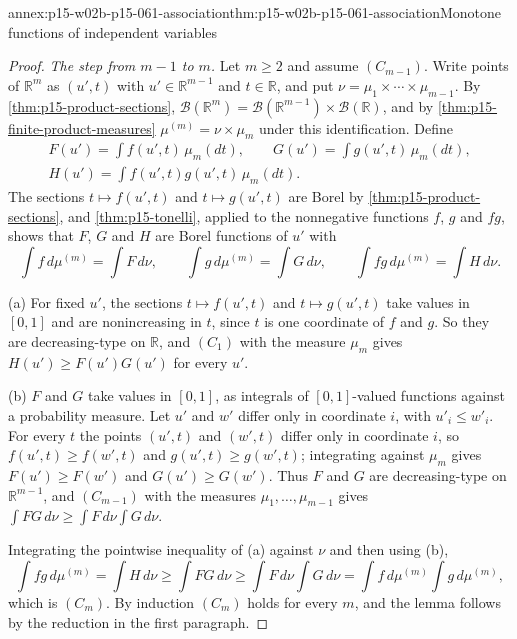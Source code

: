 \begin{annexitem}{annex:p15-w02b-p15-061-association}{thm:p15-w02b-p15-061-association}{Monotone functions of independent variables}
\begin{proof}
\emph{The step from \(m-1\) to \(m\).} Let \(m\geq2\) and assume
\((C_{m-1})\). Write points of \(\mathbb R^m\) as \((u',t)\) with
\(u'\in\mathbb R^{m-1}\) and \(t\in\mathbb R\), and put
\(\nu=\mu_1\times\cdots\times\mu_{m-1}\). By
\cref{thm:p15-product-sections},
\(\mathcal B(\mathbb R^m)=\mathcal B(\mathbb R^{m-1})\times\mathcal B(\mathbb R)\),
and by \cref{thm:p15-finite-product-measures}
\(\mu^{(m)}=\nu\times\mu_m\) under this identification. Define
\begin{gather*}
 F(u')=\int f(u',t)\,\mu_m(dt),\qquad
 G(u')=\int g(u',t)\,\mu_m(dt),\\
 H(u')=\int f(u',t)g(u',t)\,\mu_m(dt).
\end{gather*}
The sections \(t\mapsto f(u',t)\) and \(t\mapsto g(u',t)\) are Borel by
\cref{thm:p15-product-sections}, and \cref{thm:p15-tonelli}, applied to
the nonnegative functions \(f\), \(g\) and \(fg\), shows that \(F\),
\(G\) and \(H\) are Borel functions of \(u'\) with
\[
 \int f\,d\mu^{(m)}=\int F\,d\nu,\qquad
 \int g\,d\mu^{(m)}=\int G\,d\nu,\qquad
 \int fg\,d\mu^{(m)}=\int H\,d\nu .
\]

(a) For fixed \(u'\), the sections \(t\mapsto f(u',t)\) and
\(t\mapsto g(u',t)\) take values in \([0,1]\) and are nonincreasing in
\(t\), since \(t\) is one coordinate of \(f\) and \(g\). So they are
decreasing-type on \(\mathbb R\), and \((C_1)\) with the measure
\(\mu_m\) gives \(H(u')\geq F(u')G(u')\) for every \(u'\).

(b) \(F\) and \(G\) take values in \([0,1]\), as integrals of
\([0,1]\)-valued functions against a probability measure. Let \(u'\) and
\(w'\) differ only in coordinate \(i\), with \(u'_i\leq w'_i\). For every
\(t\) the points \((u',t)\) and \((w',t)\) differ only in coordinate
\(i\), so \(f(u',t)\geq f(w',t)\) and \(g(u',t)\geq g(w',t)\);
integrating against \(\mu_m\) gives \(F(u')\geq F(w')\) and
\(G(u')\geq G(w')\). Thus \(F\) and \(G\) are decreasing-type on
\(\mathbb R^{m-1}\), and \((C_{m-1})\) with the measures
\(\mu_1,\ldots,\mu_{m-1}\) gives
\(\int FG\,d\nu\geq\int F\,d\nu\int G\,d\nu\).

Integrating the pointwise inequality of (a) against \(\nu\) and then
using (b),
\[
 \int fg\,d\mu^{(m)}=\int H\,d\nu\geq\int FG\,d\nu
 \geq\int F\,d\nu\int G\,d\nu
 =\int f\,d\mu^{(m)}\int g\,d\mu^{(m)} ,
\]
which is \((C_m)\). By induction \((C_m)\) holds for every \(m\), and the
lemma follows by the reduction in the first paragraph.
\end{proof}
\end{annexitem}

